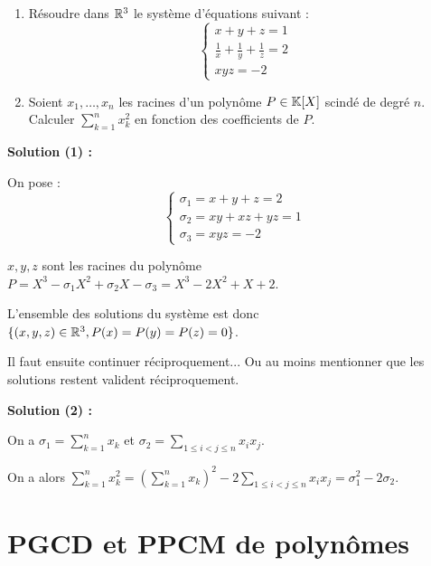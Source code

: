 \documentclass[12pt, a4paper]{report}
\begin{document}
\begin{application}
    \begin{enumerate}
        \item Résoudre dans $\mathbb{R}^3$ le système d'équations suivant :
        $$\begin{cases}
            x+y+z = 1\\
            \frac1x + \frac1y + \frac1z = 2\\
            xyz = -2
        \end{cases}$$
        \item Soient $x_1,\dots,x_n$ les racines d'un polynôme $P \in \mathbb{K}[X]$ scindé de degré $n$. Calculer $\sum_{k=1}^{n} x_k^2$ en fonction des coefficients de $P$.
    \end{enumerate}
    
    \textbf{Solution (1) :}

    On pose :
    $$\begin{cases}
    \sigma_1 = x + y + z = 2\\
    \sigma_2 = xy + xz + yz = 1\\
    \sigma_3 = xyz = -2
    \end{cases}$$

    $x,y,z$ sont les racines du polynôme $P = X^3 - \sigma_1 X^2 + \sigma_2 X - \sigma_3 = X^3 - 2X^2 + X + 2$.

    L'ensemble des solutions du système est donc $\{(x,y,z) \in \mathbb{R}^3, P(x) = P(y) = P(z) = 0\}$.

    Il faut ensuite continuer réciproquement... Ou au moins mentionner que les solutions restent valident réciproquement.

    \textbf{Solution (2) :}

    On a $\sigma_1 = \sum_{k=1}^{n} x_k$ et $\sigma_2 = \sum_{1 \le i < j \le n} x_i x_j$.

    On a alors $\sum_{k=1}^{n} x_k^2 = (\sum_{k=1}^{n} x_k)^2 - 2\sum_{1 \le i < j \le n} x_i x_j = \sigma_1^2 - 2\sigma_2$.
\end{application}

\section{PGCD et PPCM de polynômes}
\end{document}
